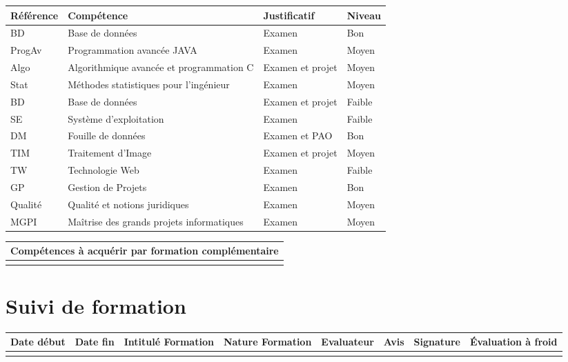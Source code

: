 \documentclass[11pt]{article}
\begin{document}
\centering
	\begin{longtable}{|p{3cm}|p{3cm}|p{3cm}|p{3cm}|}
	\hline
	\rowcolor{gray!40} Référence & Compétence & Justificatif & Niveau \\
	\hline
	 BD & Base de données & Examen & Bon \\
	 \hline
	 ProgAv & Programmation avancée JAVA & Examen & Moyen \\
	\hline
	Algo & Algorithmique avancée et programmation C & Examen et projet & Moyen \\
	\hline
	Stat & Méthodes statistiques pour l'ingénieur & Examen & Moyen \\
	\hline
	BD & Base de données & Examen et projet & Faible \\
	\hline
	SE & Système d'exploitation & Examen & Faible \\
	\hline
	DM & Fouille de données & Examen et PAO & Bon \\
	\hline
	TIM & Traitement d'Image & Examen et projet & Moyen \\
	\hline
	TW & Technologie Web & Examen & Faible \\
	\hline
	GP & Gestion de Projets & Examen & Bon \\
    \hline
	Qualité & Qualité et notions juridiques & Examen & Moyen \\
	\hline
	MGPI & Maîtrise des grands projets informatiques & Examen & Moyen \\
	\hline
	\end{longtable}

\centering
	\begin{longtable}{|p{12cm}|}
	\hline
	\rowcolor{gray!40} Compétences à acquérir par formation complémentaire \\
	\hline
	  \\
	\hline
	\end{longtable}

\section*{\large Suivi de formation}

\centering
	\begin{longtable}{|p{1.2cm}|p{1.2cm}|p{1.2cm}|p{1.2cm}|p{1.2cm}|p{1.2cm}|p{1.2cm}|p{1.2cm}|}
	\hline
	\rowcolor{gray!40} \tiny Date début & \tiny Date fin & \tiny Intitulé Formation & \tiny Nature Formation & \tiny Evaluateur & \tiny Avis & \tiny Signature & \tiny Évaluation à froid \\
	\hline
	 & & & & & & & \\
	\hline
	\end{longtable}
\end{document}
